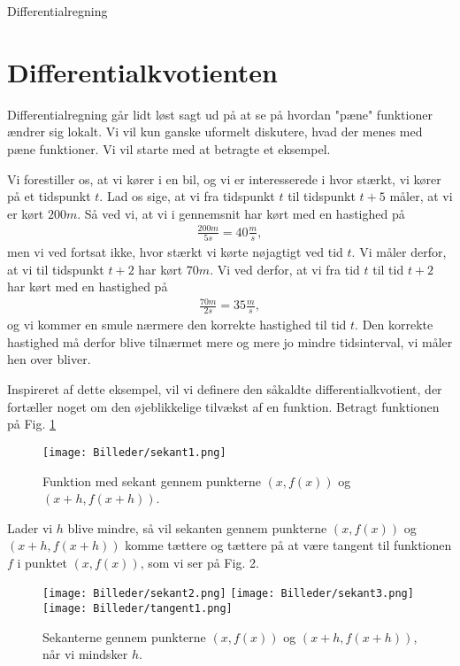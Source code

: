 

\begin{center}
\Huge
Differentialregning
\end{center}
\section*{Differentialkvotienten}

Differentialregning går lidt løst sagt ud på at se på hvordan "pæne" funktioner ændrer sig lokalt. Vi vil kun ganske uformelt diskutere, hvad der menes med pæne funktioner. Vi vil starte med at betragte et eksempel.
\begin{exa}
Vi forestiller os, at vi kører i en bil, og vi er interesserede i hvor stærkt, vi kører på et tidspunkt $t$. Lad os sige, at vi fra tidspunkt $t$ til tidspunkt $t+5$ måler, at vi er kørt $200m$. Så ved vi, at vi i gennemsnit har kørt med en hastighed på
\begin{align*}
\frac{200m}{5s} = 40\frac{m}{s},
\end{align*} 
men vi ved fortsat ikke, hvor stærkt vi kørte nøjagtigt ved tid $t$. Vi måler derfor, at vi til tidspunkt $t+2$ har kørt $70m$. Vi ved derfor, at vi fra tid $t$ til tid $t+2$ har kørt med en hastighed på 
\begin{align*}
\frac{70m}{2s} = 35\frac{m}{s},
\end{align*}
og vi kommer en smule nærmere den korrekte hastighed til tid $t$. Den korrekte hastighed må derfor blive tilnærmet mere og mere jo mindre tidsinterval, vi måler hen over bliver. 
\end{exa}
Inspireret af dette eksempel, vil vi definere den såkaldte differentialkvotient, der fortæller noget om den øjeblikkelige tilvækst af en funktion. 
Betragt funktionen på Fig. \ref{fig:sek1}
\begin{figure}[H]
\centering
\texttt{[image: Billeder/sekant1.png]}
\caption{Funktion med sekant gennem punkterne $(x,f(x))$ og $(x+h,f(x+h))$.}
\label{fig:sek1}
\end{figure}
Lader vi $h$ blive mindre, så vil sekanten gennem punkterne $(x,f(x))$ og $(x+h,f(x+h))$ komme tættere og tættere på at være tangent til funktionen $f$ i punktet $(x,f(x))$, som vi ser på Fig. 2.
\begin{figure}[H]
\texttt{[image: Billeder/sekant2.png]}
\texttt{[image: Billeder/sekant3.png]}
\texttt{[image: Billeder/tangent1.png]}
\caption{Sekanterne gennem punkterne $(x,f(x))$ og $(x+h,f(x+h))$, når vi mindsker $h$. }
\label{fig:sek2}
\end{figure}
